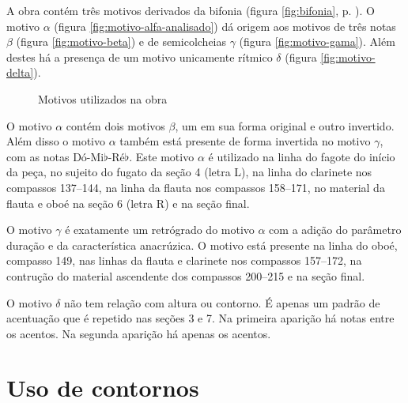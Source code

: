 A obra contém três motivos derivados da bifonia (figura
\ref{fig:bifonia}, p. \pageref{fig:bifonia}). O motivo $\alpha$
(figura \ref{fig:motivo-alfa-analisado}) dá origem aos motivos de três
notas $\beta$ (figura \ref{fig:motivo-beta}) e de semicolcheias
$\gamma$ (figura \ref{fig:motivo-gama}). Além destes há a presença de
um motivo unicamente rítmico $\delta$ (figura \ref{fig:motivo-delta}).

\begin{figure}
  \centering


  \caption{Motivos utilizados na obra}
  \label{fig:motivos-utilizados}
\end{figure}

O motivo $\alpha$ contém dois motivos $\beta$, um em sua forma
original e outro invertido. Além disso o motivo $\alpha$ também está
presente de forma invertida no motivo $\gamma$, com as notas
Dó-Mi$\flat$-Ré$\flat$. Este motivo $\alpha$ é utilizado na linha do
fagote do início da peça, no sujeito do fugato da seção 4 (letra L),
na linha do clarinete nos compassos 137--144, na linha da flauta nos
compassos 158--171, no material da flauta e oboé na seção 6 (letra R)
e na seção final.

O motivo $\gamma$ é exatamente um retrógrado do motivo $\alpha$ com a
adição do parâmetro duração e da característica anacrúzica. O motivo
está presente na linha do oboé, compasso 149, nas linhas da flauta e
clarinete nos compassos 157--172, na contrução do material ascendente
dos compassos 200--215 e na seção final.

O motivo $\delta$ não tem relação com altura ou contorno. É apenas um
padrão de acentuação que é repetido nas seções 3 e 7. Na primeira
aparição há notas  entre os acentos. Na segunda aparição
há apenas os acentos.

\section{Uso de contornos}
\label{sec:uso-de-contornos}

